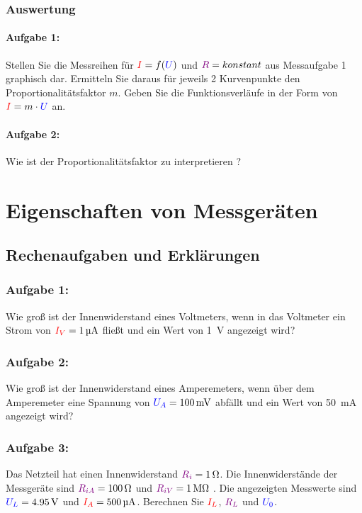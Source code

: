 \documentclass[11pt,a4paper,titlepage,parskip=half]{scrreprt}
\begin{document}
        \subsection{Auswertung}
          \subsubsection{Aufgabe 1:} Stellen Sie die Messreihen für $\textcolor{red}{I} = f(\textcolor{blue}{U})$ und $\textcolor{violet}{R} = konstant$  aus Messaufgabe 1 graphisch dar. Ermitteln Sie daraus für jeweils 2 Kurvenpunkte den Proportionalitätsfaktor $m$. Geben Sie die Funktionsverläufe in der Form von $\textcolor{red}{I} = m \cdot \textcolor{blue}{U}$ an.
            
          
          
          \subsubsection{Aufgabe 2:} Wie ist der Proportionalitätsfaktor zu interpretieren ? 
          
    \chapter{Eigenschaften von Messgeräten}


        \section{Rechenaufgaben und Erklärungen}
           
           \subsection{Aufgabe 1:} Wie groß ist der Innenwiderstand eines Voltmeters, wenn in das Voltmeter ein Strom von $\textcolor{red}{I_V} = \SI{1}{\micro\ampere}$ fließt und ein Wert von \SI{1}{\volt} angezeigt wird?
           \subsection{Aufgabe 2:} Wie groß ist der Innenwiderstand eines Amperemeters, wenn über dem Amperemeter eine Spannung von $\textcolor{blue}{U_A} = \SI{100}{\milli\volt}$ abfällt und ein Wert von \SI{50}{\milli\ampere} angezeigt wird?
           \subsection{Aufgabe 3:}  Das Netzteil hat einen Innenwiderstand $\textcolor{violet}{R_i} = \SI{1}{\ohm}$. Die Innenwiderstände der Messgeräte sind $\textcolor{violet}{R_{iA}} = \SI{100}{\ohm}$ und $\textcolor{violet}{R_{iV}} = \SI{1}{\mega\ohm}$ . Die angezeigten Messwerte sind $\textcolor{blue}{U_L} = \SI{4,95}{\volt}$ und $\textcolor{red}{I_A} = \SI{500}{\micro\ampere}$.  Berechnen Sie $\textcolor{red}{I_L}$, $\textcolor{violet}{R_L}$ und $\textcolor{blue}{U_0}$.
\end{document}
